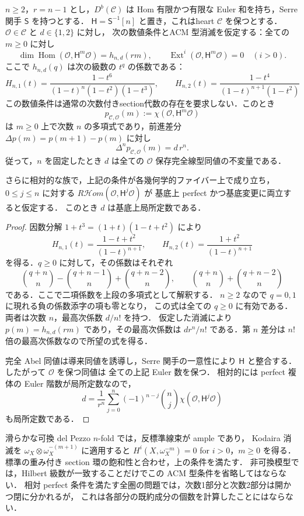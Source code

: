 \begin{proposition}[次数の圏論的不変性]
\label{prop:ncdp-intrinsic-degree}
$n\ge2$，$r=n-1$ とし，$D^b(\mathcal C)$ は Hom 有限かつ有限な
Euler 和を持ち，Serre 関手 $\mathsf S$ を持つとする．
$\mathsf H=\mathsf S^{-1}[n]$ と置き，これはheart $\mathcal C$ を保つとする．
$\mathcal O\in\mathcal C$ と $d\in\{1,2\}$ に対し，
次の数値条件とACM 型消滅を仮定する：全ての $m\ge0$ に対し
\[
 \dim\operatorname{Hom}(\mathcal O,\mathsf H^m\mathcal O)=h_{n,d}(rm),
 \qquad
 \operatorname{Ext}^i(\mathcal O,\mathsf H^m\mathcal O)=0\quad(i>0).
\]
ここで $h_{n,d}(q)$ は次の級数の $t^q$ の係数である：
\[
 H_{n,1}(t)=\frac{1-t^6}{(1-t)^n(1-t^2)(1-t^3)},\qquad
 H_{n,2}(t)=\frac{1-t^4}{(1-t)^{n+1}(1-t^2)}
\]
この数値条件は通常の次数付きsection代数の存在を要求しない．このとき
\[
 p_{\mathcal C,\mathcal O}(m)
 :=\chi(\mathcal O,\mathsf H^m\mathcal O)
\]
は $m\ge0$ 上で次数 $n$ の多項式であり，前進差分 $\Delta p(m)=p(m+1)-p(m)$ に対し
\[
 \Delta^n p_{\mathcal C,\mathcal O}(m)=d\,r^n.
\]
従って，$n$ を固定したとき $d$ は全ての $\mathcal O$ 保存完全線型同値の不変量である．

さらに相対的な族で，上記の条件が各幾何学的ファイバー上で成り立ち，
$0\le j\le n$ に対する $R\mathcal Hom(\mathcal O,\mathsf H^j\mathcal O)$ が
基底上 perfect かつ基底変更に両立すると仮定する．
このとき $d$ は基底上局所定数である．
\end{proposition}
\begin{proof}
因数分解 $1+t^3=(1+t)(1-t+t^2)$ により
\[
 H_{n,1}(t)=\frac{1-t+t^2}{(1-t)^{n+1}},\qquad
 H_{n,2}(t)=\frac{1+t^2}{(1-t)^{n+1}}
\]
を得る．$q\ge0$ に対して，その係数はそれぞれ
\[
 \binom{q+n}{n}-\binom{q+n-1}{n}+\binom{q+n-2}{n},
 \qquad
 \binom{q+n}{n}+\binom{q+n-2}{n}
\]
である．ここで二項係数を上段の多項式として解釈する．
$n\ge2$ なので $q=0,1$ に現れる負の係数添字の項も零となり，
この式は全ての $q\ge0$ に有効である．
両者は次数 $n$，最高次係数 $d/n!$ を持つ．
仮定した消滅により $p(m)=h_{n,d}(rm)$ であり，その最高次係数は
$d r^n/n!$ である．第 $n$ 差分は $n!$ 倍の最高次係数なので所望の式を得る．

完全 Abel 同値は導来同値を誘導し，Serre 関手の一意性により
$\mathsf H$ と整合する．したがって $\mathcal O$ を保つ同値は
全ての上記 Euler 数を保つ．
相対的には perfect 複体の Euler 階数が局所定数なので，
\[
 d=\frac{1}{r^n}\sum_{j=0}^n(-1)^{n-j}\binom nj
      \chi(\mathcal O,\mathsf H^j\mathcal O)
\]
も局所定数である．
\end{proof}

滑らかな可換 del Pezzo $n$-fold では，反標準線束が ample であり，
Kodaira 消滅を $\omega_X\otimes\omega_X^{-(m+1)}$ に適用すると
$H^i(X,\omega_X^{-m})=0$ for $i>0$，$m\ge0$ を得る．
標準の重み付き section 環の飽和性と合わせ，上の条件を満たす．
非可換模型では，Hilbert 級数が一致することだけでこの ACM 型条件を省略してはならない．
相対 perfect 条件を満たす全圏の問題では，次数1部分と次数2部分は開かつ閉に分かれるが，
これは各部分の既約成分の個数を計算したことにはならない．

